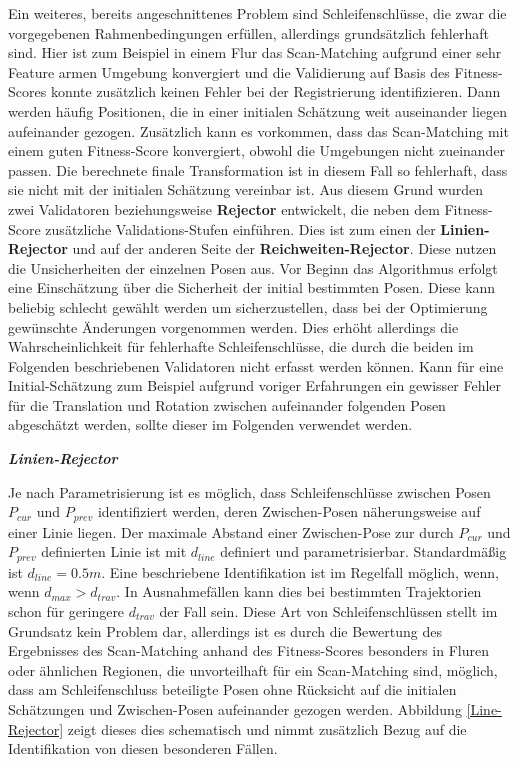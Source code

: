 Ein weiteres, bereits angeschnittenes Problem sind Schleifenschlüsse, die zwar die vorgegebenen Rahmenbedingungen erfüllen, allerdings grundsätzlich fehlerhaft sind. Hier ist zum Beispiel in einem Flur das Scan-Matching aufgrund einer sehr Feature armen Umgebung konvergiert und die Validierung auf Basis des Fitness-Scores konnte zusätzlich keinen Fehler bei der Registrierung identifizieren. Dann werden häufig Positionen, die in einer initialen Schätzung weit auseinander liegen aufeinander gezogen. Zusätzlich kann es vorkommen, dass das Scan-Matching mit einem guten Fitness-Score konvergiert, obwohl die Umgebungen nicht zueinander passen. Die berechnete finale Transformation ist in diesem Fall so fehlerhaft, dass sie nicht mit der initialen Schätzung vereinbar ist. Aus diesem Grund wurden zwei Validatoren beziehungsweise \textbf{Rejector} entwickelt, die neben dem Fitness-Score zusätzliche Validations-Stufen einführen. Dies ist zum einen der \textbf{Linien-Rejector} und auf  der anderen Seite der \textbf{Reichweiten-Rejector}. Diese nutzen die Unsicherheiten der einzelnen Posen aus. Vor Beginn das Algorithmus erfolgt eine Einschätzung über die Sicherheit der initial bestimmten Posen. Diese kann beliebig schlecht gewählt werden um sicherzustellen, dass bei der Optimierung gewünschte Änderungen vorgenommen werden. Dies erhöht allerdings die Wahrscheinlichkeit für fehlerhafte Schleifenschlüsse, die durch die beiden im Folgenden beschriebenen Validatoren nicht erfasst werden können. Kann für eine Initial-Schätzung zum Beispiel aufgrund voriger Erfahrungen ein gewisser Fehler für die Translation und Rotation zwischen aufeinander folgenden Posen abgeschätzt werden, sollte dieser im Folgenden verwendet werden.

\textbf{\textsl{Linien-Rejector}}

Je nach Parametrisierung ist es möglich, dass Schleifenschlüsse zwischen Posen $P_{cur}$ und $P_{prev}$ identifiziert werden, deren Zwischen-Posen näherungsweise auf einer Linie liegen. Der maximale Abstand einer Zwischen-Pose zur durch $P_{cur}$ und $P_{prev}$ definierten Linie ist mit $d_{line}$ definiert und parametrisierbar. Standardmäßig ist $d_{line} = 0.5m$. Eine beschriebene Identifikation ist im Regelfall möglich, wenn, wenn $d_{max} > d_{trav}$. In Ausnahmefällen kann dies bei bestimmten Trajektorien schon für geringere $d_{trav}$ der Fall sein. Diese Art von Schleifenschlüssen stellt im Grundsatz kein Problem dar, allerdings ist es durch die Bewertung des Ergebnisses des Scan-Matching anhand des Fitness-Scores besonders in Fluren oder ähnlichen Regionen, die unvorteilhaft für ein Scan-Matching sind, möglich, dass am Schleifenschluss beteiligte Posen ohne Rücksicht auf die initialen Schätzungen und Zwischen-Posen aufeinander gezogen werden. Abbildung \ref{Line-Rejector} zeigt dieses dies schematisch und nimmt zusätzlich Bezug auf die Identifikation von diesen besonderen Fällen.

